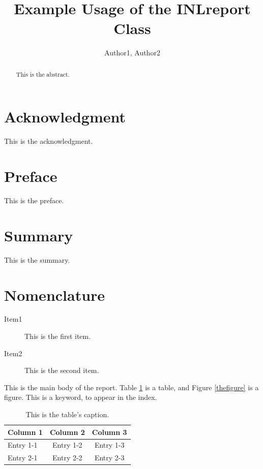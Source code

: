 \documentclass[12pt]{INLreport}
\title{Example Usage of the INLreport Class}
\author{Author1, Author2}
\date{} %
\begin{document}
\maketitle

\begin{abstract}
This is the abstract.
\end{abstract}

\clearpage
\section*{Acknowledgment}
This is the acknowledgment.

\cleardoublepage %
\tableofcontents
\listoffigures %
\listoftables  %

\clearpage
\section*{Preface}
This is the preface.

\clearpage
\section*{Summary}
This is the summary.

\clearpage
\section*{Nomenclature}
\begin{description}
  \item[Item1] This is the first item.
  \item[Item2] This is the second item.
\end{description}

\INLmain

This is the main body of the report\cite{ref1,ref2}. Table \ref{thetable} is a
table, and Figure \ref{thefigure} is a figure. This is a keyword,
to appear in the index.

\begin{table}[hbtp!]
  \centering
  \caption{This is the table's caption.}
  \label{thetable}
  \begin{tabular}{l c c}
    \toprule
    Column 1 & Column 2 & Column 3\\
    \midrule
    Entry 1-1 & Entry 1-2 & Entry 1-3\\
    Entry 2-1 & Entry 2-2 & Entry 2-3\\
    \bottomrule
  \end{tabular}
\end{table}
\end{document}

